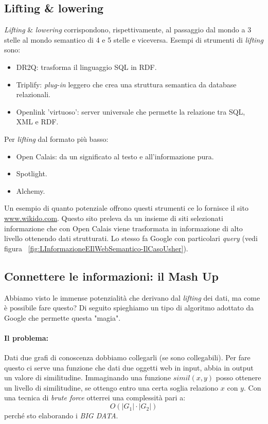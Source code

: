 		\subsection{Lifting \& lowering}
			\emph{Lifting} \& \emph{lowering} corrispondono, rispettivamente, al passaggio dal mondo a 3 stelle al mondo semantico di 4 e 5 stelle e viceversa.
			Esempi di strumenti di \emph{lifting} sono:
			\begin{itemize}
				\item DR2Q: trasforma il linguaggio SQL in RDF.
				\item Triplify: \emph{plug-in} leggero che crea una struttura semantica da database relazionali.
				\item Openlink 'virtuoso': server universale che permette la relazione tra SQL, XML e RDF.
			\end{itemize}
			Per \emph{lifting} dal formato più basso:
			\begin{itemize}
				\item Open Calais: da un significato al testo e all'informazione pura.
				\item Spotlight.
				\item Alchemy.
			\end{itemize}
			Un esempio di quanto potenziale offrono questi strumenti ce lo fornisce il sito \href{http://www.wikido.com/}{www.wikido.com}. Questo sito preleva da un insieme di siti selezionati informazione che con Open Calais viene trasformata in informazione di alto livello ottenendo dati strutturati.
			Lo stesso fa Google con particolari \emph{query} (vedi figura ~\ref{fig:LInformazioneEIlWebSemantico-IlCasoUsher}).
			
		
		\subsection{Connettere le informazioni: il Mash Up}
			Abbiamo visto le immense potenzialità che derivano dal \emph{lifting} dei dati, ma come è possibile fare questo? Di seguito spieghiamo un tipo di algoritmo adottato da Google che permette questa "magia".
			
			\paragraph*{Il problema:}  Dati due grafi di conoscenza dobbiamo collegarli (se sono collegabili). Per fare questo ci serve una funzione che dati due oggetti web in input, abbia in output un valore di similitudine.
			Immaginando una funzione $simil(x,y)$ posso ottenere un livello di similitudine, se ottengo entro una certa soglia relaziono $x$ con $y$. Con una tecnica di \emph{brute force} otterrei una complessità pari a:
			\[
				O(|G_1| \cdot |G_2|) 
			\]
			perché sto elaborando i \emph{BIG DATA}.
			
